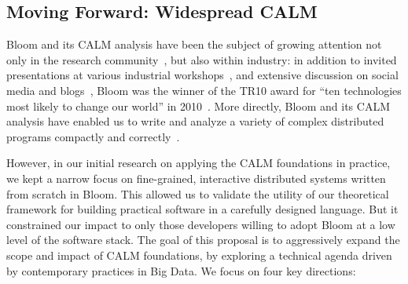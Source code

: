\subsection{Moving Forward: Widespread CALM}
Bloom and its CALM analysis have been the subject of growing attention not only in the research community~\cite{Abiteboul2011,Ameloot2011a,Ameloot2011,Zinn2012}, but also within industry: in addition to invited presentations at various industrial workshops~\cite{goto11,langnext12,basho12}, and extensive discussion on social media and blogs~\cite{}, Bloom was the winner of the TR10 award for ``ten technologies most likely to change our world'' in 2010~\cite{tr10}.  More directly, Bloom and its CALM analysis have enabled us to write and analyze a variety of complex distributed programs compactly and correctly~\cite{bud-sandbox}.  

However, in our initial research on applying the CALM foundations in practice,
we kept a narrow focus on fine-grained, interactive distributed systems written
from scratch in Bloom.  This allowed us to validate the utility of our
theoretical framework for building practical software in a carefully designed
language.  But it constrained our impact to only those developers willing to
adopt Bloom at a low level of the software stack.  The goal of this proposal is
to aggressively expand the scope and impact of CALM foundations, by exploring a
technical agenda driven by contemporary practices in Big Data.  We focus on four
key directions:

